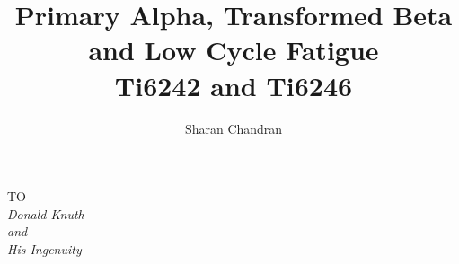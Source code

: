 \documentclass[12pt]{iiscthes} %
\begin{document}
\makeatletter %
\makeatother %
\begin{frontmatter}

\title{Primary Alpha, Transformed Beta and Low Cycle Fatigue\\ 
	   Ti6242 and Ti6246\\
	}
\author{Sharan Chandran}
\enggfaculty
\iisclogotrue %
\tablespagetrue %
\maketitle


\begin{dedication}
\begin{center}
TO \\[2em]
\large\it Donald Knuth\\
and\\
\large\it His Ingenuity 
\end{center}
\end{dedication}
\acknowledgements


\end{frontmatter}
\end{document}
